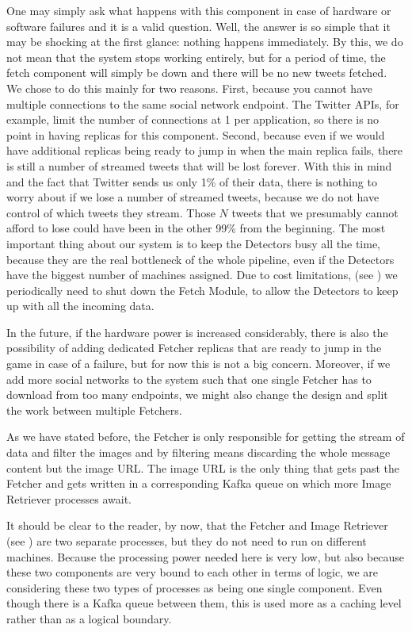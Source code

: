One may simply ask what happens with this component in case of hardware or
software failures and it is a valid question. Well, the answer is so simple
that it may be shocking at the first glance: nothing happens immediately. By
this, we do not mean that the system stops working entirely, but for a period
of time, the fetch component will simply be down and there will be no new
tweets fetched. We chose to do this mainly for two reasons. First, because you
cannot have multiple connections to the same social network endpoint. The
Twitter APIs, for example, limit the number of connections at 1 per
application, so there is no point in having replicas for this component.
Second, because even if we would have additional replicas being ready to jump in when the
main replica fails, there is still a number of streamed tweets that will be
lost forever. With this in mind and the fact that Twitter sends us only 1\%
of their data, there is nothing to worry about if we lose a number of streamed
tweets, because we do not have control of which tweets they stream. Those
\(N\) tweets that we presumably cannot afford to lose could have been in the
other 99\% from the beginning. The most important thing about our system is to
keep the Detectors busy all the time, because they are the real bottleneck of
the whole pipeline, even if the Detectors have the biggest number of machines
assigned. Due to cost limitations, (see
) we periodically need to shut
down the Fetch Module, to allow the Detectors to keep up with all the incoming
data.

In the future, if the hardware power is increased considerably, there is also
the possibility of adding dedicated Fetcher replicas that are ready to jump in
the game in case of a failure, but for now this is not a big concern.
Moreover, if we add more social networks to the system such that one single
Fetcher has to download from too many endpoints, we might also change the
design and split the work between multiple Fetchers.

As we have stated before, the Fetcher is only responsible for getting the
stream of data and filter the images and by filtering means discarding the
whole message content but the image URL. The image URL is the only thing that
gets past the Fetcher and gets written in a corresponding Kafka queue on which
more Image Retriever processes await.

It should be clear to the reader, by now, that the Fetcher and Image Retriever
(see ) are two separate processes, but they
do not need to run on different machines. Because the processing power needed here is
very low, but also because these two components are very bound to each other
in terms of logic, we are considering these two types of processes as
being one single component. Even though there is a Kafka queue between them,
this is used more as a caching level rather than as a logical boundary.

